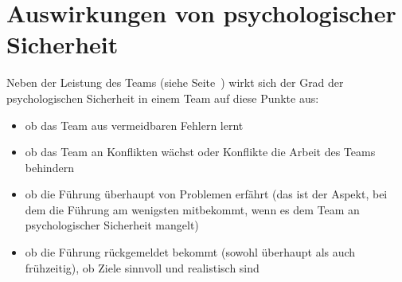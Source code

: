 \section{Auswirkungen von psychologischer Sicherheit}
\label{ps-auswirkungen}


Neben der Leistung des Teams (siehe Seite~\pageref{ps-leistung}) wirkt sich der Grad der psychologischen Sicherheit in einem Team auf diese Punkte aus:

\begin{itemize}
  \item ob das Team aus vermeidbaren Fehlern lernt 
  \item ob das Team an Konflikten wächst oder Konflikte die Arbeit des Teams behindern 
  \item ob die Führung überhaupt von Problemen erfährt (das ist der Aspekt, bei dem die Führung am wenigsten mitbekommt, wenn es dem Team an psychologischer Sicherheit mangelt) 
  \item ob die Führung rückgemeldet bekommt (sowohl überhaupt als auch frühzeitig), ob Ziele sinnvoll und realistisch sind 
\end{itemize}
